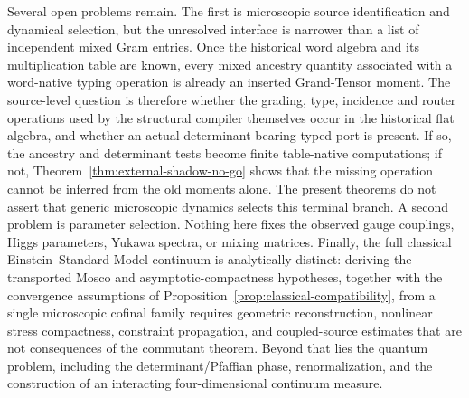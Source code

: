 \documentclass[11pt]{article}
\theoremstyle{definition}
\theoremstyle{remark}
\begin{document}
Several open problems remain.  The first is microscopic source identification
and dynamical selection, but the unresolved interface is narrower than a list
of independent mixed Gram entries.  Once the historical word algebra and its
multiplication table are known, every mixed ancestry quantity associated with
a word-native typing operation is already an inserted Grand-Tensor moment.
The source-level question is therefore whether the grading, type, incidence and
router operations used by the structural compiler themselves occur in the
historical flat algebra, and whether an actual determinant-bearing typed port
is present.  If so, the ancestry and determinant tests become finite table-native
computations; if not, Theorem~\ref{thm:external-shadow-no-go} shows that the
missing operation cannot be inferred from the old moments alone.  The present
theorems do not assert that generic microscopic dynamics selects this terminal
branch.  A second problem is parameter selection.  Nothing here fixes the observed gauge
couplings, Higgs parameters, Yukawa spectra, or mixing matrices.  Finally, the
full classical Einstein--Standard-Model continuum is analytically distinct:
deriving the transported Mosco and asymptotic-compactness hypotheses, together
with the convergence assumptions of
Proposition~\ref{prop:classical-compatibility}, from a single microscopic
cofinal family requires geometric reconstruction, nonlinear stress compactness,
constraint propagation, and coupled-source estimates that are not consequences
of the commutant theorem.  Beyond that lies the quantum problem, including the
determinant/Pfaffian phase, renormalization, and the construction of an
interacting four-dimensional continuum measure.
\end{document}

